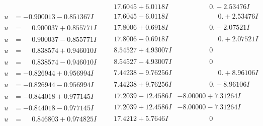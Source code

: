 \documentclass[1p]{elsarticle_modified}
\theoremstyle{definition}
\begin{document}
$$\begin{array}{c|c|c}
 & \phantom{-}17.6045 + 6.0118 I & \phantom{-0.000000 } 0. - 2.53476 I \\ \hline\begin{aligned}
u &= -0.900013 - 0.851367 I\end{aligned}
 & \phantom{-}17.6045 - 6.0118 I & \phantom{-0.000000 -}0. + 2.53476 I \\ \hline\begin{aligned}
u &= \phantom{-}0.900037 + 0.855771 I\end{aligned}
 & \phantom{-}17.8006 + 0.6918 I & \phantom{-0.000000 } 0. - 2.07521 I \\ \hline\begin{aligned}
u &= \phantom{-}0.900037 - 0.855771 I\end{aligned}
 & \phantom{-}17.8006 - 0.6918 I & \phantom{-0.000000 -}0. + 2.07521 I \\ \hline\begin{aligned}
u &= \phantom{-}0.838574 + 0.946010 I\end{aligned}
 & \phantom{-}8.54527 + 4.93007 I & \phantom{-0.000000 } 0 \\ \hline\begin{aligned}
u &= \phantom{-}0.838574 - 0.946010 I\end{aligned}
 & \phantom{-}8.54527 - 4.93007 I & \phantom{-0.000000 } 0 \\ \hline\begin{aligned}
u &= -0.826944 + 0.956994 I\end{aligned}
 & \phantom{-}7.44238 - 9.76256 I & \phantom{-0.000000 -}0. + 8.96106 I \\ \hline\begin{aligned}
u &= -0.826944 - 0.956994 I\end{aligned}
 & \phantom{-}7.44238 + 9.76256 I & \phantom{-0.000000 } 0. - 8.96106 I \\ \hline\begin{aligned}
u &= -0.844018 + 0.977145 I\end{aligned}
 & \phantom{-}17.2039 - 12.4586 I & -8.00000 + 7.31264 I \\ \hline\begin{aligned}
u &= -0.844018 - 0.977145 I\end{aligned}
 & \phantom{-}17.2039 + 12.4586 I & -8.00000 - 7.31264 I \\ \hline\begin{aligned}
u &= \phantom{-}0.846803 + 0.974825 I\end{aligned}
 & \phantom{-}17.4212 + 5.7646 I & \phantom{-0.000000 } 0 \\ \hline\begin{aligned}

\end{aligned}
\end{array}$$
\end{document}
